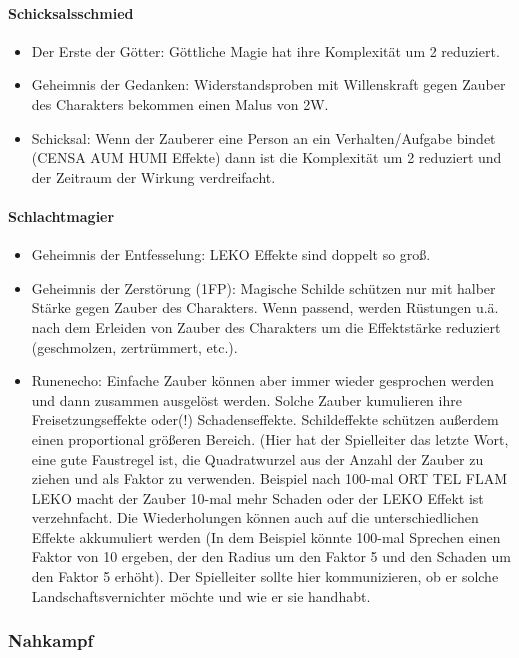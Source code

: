 \documentclass{article}
\begin{document}
\paragraph{Schicksalsschmied}

\begin{itemize}
\item Der Erste der Götter: Göttliche Magie hat ihre Komplexität um 2 reduziert.
\item Geheimnis der Gedanken: Widerstandsproben mit Willenskraft gegen Zauber des Charakters bekommen einen Malus von 2W.
\item Schicksal: Wenn der Zauberer eine Person an ein Verhalten/Aufgabe bindet (CENSA AUM HUMI Effekte) dann ist die Komplexität um 2 reduziert und der Zeitraum der Wirkung verdreifacht.
\end{itemize}

\paragraph{Schlachtmagier}

\begin{itemize}
\item Geheimnis der Entfesselung: LEKO Effekte sind doppelt so groß.
\item Geheimnis der Zerstörung (1FP): Magische Schilde schützen nur mit halber Stärke gegen Zauber des Charakters. Wenn passend, werden Rüstungen u.ä. nach dem Erleiden von Zauber des Charakters um die Effektstärke reduziert (geschmolzen, zertrümmert, etc.).
\item Runenecho: Einfache Zauber können aber immer wieder gesprochen werden und dann zusammen ausgelöst werden. Solche Zauber kumulieren ihre Freisetzungseffekte oder(!) Schadenseffekte. Schildeffekte schützen außerdem einen proportional größeren Bereich. (Hier hat der Spielleiter das letzte Wort, eine gute Faustregel ist, die Quadratwurzel aus der Anzahl der Zauber zu ziehen und als Faktor zu verwenden. Beispiel nach 100-mal ORT TEL FLAM LEKO macht der Zauber 10-mal mehr Schaden oder der LEKO Effekt ist verzehnfacht. Die Wiederholungen können auch auf die unterschiedlichen Effekte akkumuliert werden (In dem Beispiel könnte 100-mal Sprechen einen Faktor von 10 ergeben, der den Radius um den Faktor 5 und den Schaden um den Faktor 5 erhöht). Der Spielleiter sollte hier kommunizieren, ob er solche Landschaftsvernichter möchte und wie er sie handhabt.
\end{itemize}

\subsubsection{Nahkampf}
\end{document}
